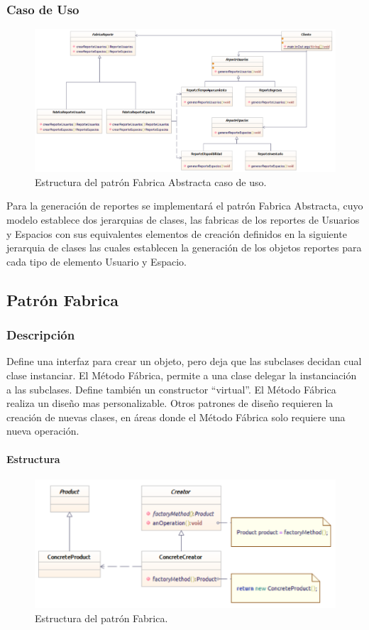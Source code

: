 \subsubsection{Caso de Uso}

\begin{figure}[th!]
	\centering
	\includegraphics[width=.9\linewidth]{imagenes/Patrones/Fabrica_caso.pdf}
	\caption{Estructura del patrón Fabrica Abstracta caso de uso.\cite{gof}}	
\end{figure}

Para la generación de reportes se implementará el patrón Fabrica Abstracta, cuyo modelo establece dos jerarquias de clases, las fabricas de los reportes de Usuarios y Espacios con sus equivalentes elementos de creación definidos en la siguiente jerarquia de clases las cuales establecen la generación de los objetos reportes para cada tipo de elemento Usuario y Espacio.

\subsection{Patrón Fabrica}
\subsubsection{Descripción}
Define una interfaz para crear un objeto, pero deja que las subclases decidan cual clase instanciar. El Método Fábrica, permite a una clase delegar la instanciación a las subclases. Define también un constructor “virtual”.
El Método Fábrica realiza un diseño mas personalizable. Otros patrones de diseño requieren la creación de nuevas clases, en áreas donde el Método Fábrica solo requiere una nueva operación.


\paragraph{Estructura}

\begin{figure}[th!]
	\centering
	\includegraphics[width=.7\linewidth]{imagenes/Patrones/Builder.pdf}
	\caption{Estructura del patrón Fabrica.\cite{gof}}	
\end{figure}

